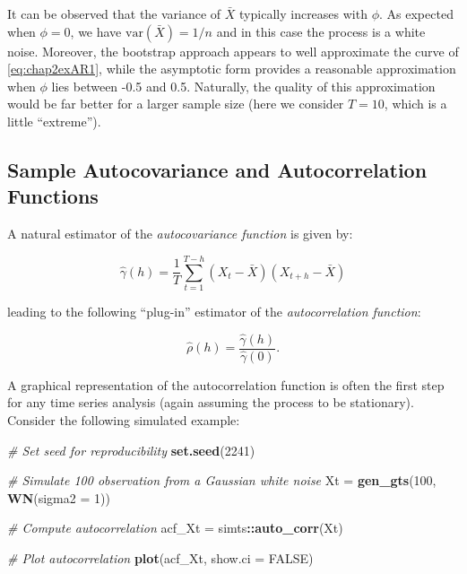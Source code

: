 \documentclass[]{book}
\newenvironment{Shaded}{\begin{snugshade}}{\end{snugshade}}
\newcommand{\CommentTok}[1]{\textcolor[rgb]{0.56,0.35,0.01}{\textit{#1}}}
\newcommand{\DataTypeTok}[1]{\textcolor[rgb]{0.13,0.29,0.53}{#1}}
\newcommand{\DecValTok}[1]{\textcolor[rgb]{0.00,0.00,0.81}{#1}}
\newcommand{\KeywordTok}[1]{\textcolor[rgb]{0.13,0.29,0.53}{\textbf{#1}}}
\newcommand{\NormalTok}[1]{#1}
\newcommand{\OperatorTok}[1]{\textcolor[rgb]{0.81,0.36,0.00}{\textbf{#1}}}
\newcommand{\OtherTok}[1]{\textcolor[rgb]{0.56,0.35,0.01}{#1}}
\newcommand{\StringTok}[1]{\textcolor[rgb]{0.31,0.60,0.02}{#1}}
\theoremstyle{definition}
\theoremstyle{definition}
\theoremstyle{definition}
\theoremstyle{remark}
\begin{document}
It can be observed that the variance of \(\bar{X}\) typically increases
with \(\phi\). As expected when \(\phi = 0\), we have
\(\text{var}(\bar{X}) = 1/n\) and in this case the process is a white
noise. Moreover, the bootstrap approach appears to well approximate the
curve of \eqref{eq:chap2exAR1}, while the asymptotic form provides a
reasonable approximation when \(\phi\) lies between -0.5 and 0.5.
Naturally, the quality of this approximation would be far better for a
larger sample size (here we consider \(T = 10\), which is a little
``extreme'').

\hypertarget{sample-autocovariance-and-autocorrelation-functions}{%
\subsection{Sample Autocovariance and Autocorrelation
Functions}\label{sample-autocovariance-and-autocorrelation-functions}}

A natural estimator of the \emph{autocovariance function} is given by:

\[\hat \gamma \left( h \right) = \frac{1}{T}\sum\limits_{t = 1}^{T - h} {\left( {{X_t} - \bar X} \right)\left( {{X_{t + h}} - \bar X} \right)} \]

leading to the following ``plug-in'' estimator of the
\emph{autocorrelation function}:

\[\hat \rho \left( h \right) = \frac{{\hat \gamma \left( h \right)}}{{\hat \gamma \left( 0 \right)}}.\]

A graphical representation of the autocorrelation function is often the
first step for any time series analysis (again assuming the process to
be stationary). Consider the following simulated example:

\begin{Shaded}
\begin{Highlighting}[]
\CommentTok{# Set seed for reproducibility}
\KeywordTok{set.seed}\NormalTok{(}\DecValTok{2241}\NormalTok{)}

\CommentTok{# Simulate 100 observation from a Gaussian white noise}
\NormalTok{Xt =}\StringTok{ }\KeywordTok{gen_gts}\NormalTok{(}\DecValTok{100}\NormalTok{, }\KeywordTok{WN}\NormalTok{(}\DataTypeTok{sigma2 =} \DecValTok{1}\NormalTok{))}

\CommentTok{# Compute autocorrelation}
\NormalTok{acf_Xt =}\StringTok{ }\NormalTok{simts}\OperatorTok{::}\KeywordTok{auto_corr}\NormalTok{(Xt)}

\CommentTok{# Plot autocorrelation}
\KeywordTok{plot}\NormalTok{(acf_Xt, }\DataTypeTok{show.ci =} \OtherTok{FALSE}\NormalTok{)}
\end{Highlighting}
\end{Shaded}
\end{document}
